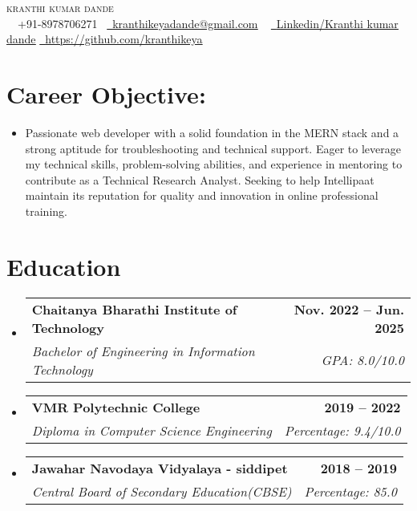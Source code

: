 \documentclass[letterpaper,11pt]{article}
\makeatletter
\newcommand{\resumeItem}[1]{
  \item\small{
    {#1 \vspace{-2pt}}
  }
}
\newcommand{\resumeSubheading}[4]{
  \vspace{-2pt}\item
    \begin{tabular*}{1.0\textwidth}[t]{l@{\extracolsep{\fill}}r}
      \textbf{#1} & \textbf{\small #2} \\
      \textit{\small#3} & \textit{\small #4} \\
    \end{tabular*}\vspace{-7pt}
}
\newcommand{\resumeSubHeadingListStart}{\begin{itemize}[leftmargin=0.0in, label={}]}
\newcommand{\resumeSubHeadingListEnd}{\end{itemize}}
\makeatother
\begin{document}

\begin{center}
    {\Huge \scshape kranthi kumar dande } \\ \vspace{10pt}\
    \small \raisebox{-0.1\height}\faPhone\ +91-8978706271~
    \href{vasanth.svvan5@gmail.com}{\raisebox{-0.2\height}\faEnvelope\  \underline{kranthikeyadande@gmail.com}} ~ 
    \href{https://www.linkedin.com/in/kranthi-kumar-dande-615502279/}{\raisebox{-0.2\height}\faLinkedin\ \underline{Linkedin/Kranthi kumar dande}}
    \href{https://github.com/kranthikeya}{\raisebox{-0.2\height}\faGithub\ \underline{https://github.com/kranthikeya
}}
    \vspace{-2pt}
\end{center}


\section{{Career Objective:}}
    \resumeSubHeadingListStart
        \resumeItem{Passionate web developer with a solid foundation in the MERN stack and a strong aptitude for troubleshooting and technical support. Eager to leverage my technical skills, problem-solving abilities, and experience in mentoring to contribute as a Technical Research Analyst. Seeking to help Intellipaat maintain its reputation for quality and innovation in online professional training.}{}{}
       
    \resumeSubHeadingListEnd
  

\section{Education}
  \resumeSubHeadingListStart
    \resumeSubheading
      {Chaitanya Bharathi Institute of Technology}{Nov. 2022 -- Jun. 2025}
      {Bachelor of Engineering in Information Technology}{GPA: 8.0/10.0}
      \resumeSubheading
      {VMR Polytechnic College}{2019 --  2022}
      {Diploma in Computer Science Engineering}{Percentage: 9.4/10.0}
      \resumeSubheading
      {Jawahar Navodaya Vidyalaya - siddipet }{2018 --  2019}
      {Central Board of Secondary Education(CBSE)}{Percentage: 85.0}
  \resumeSubHeadingListEnd
\end{document}
